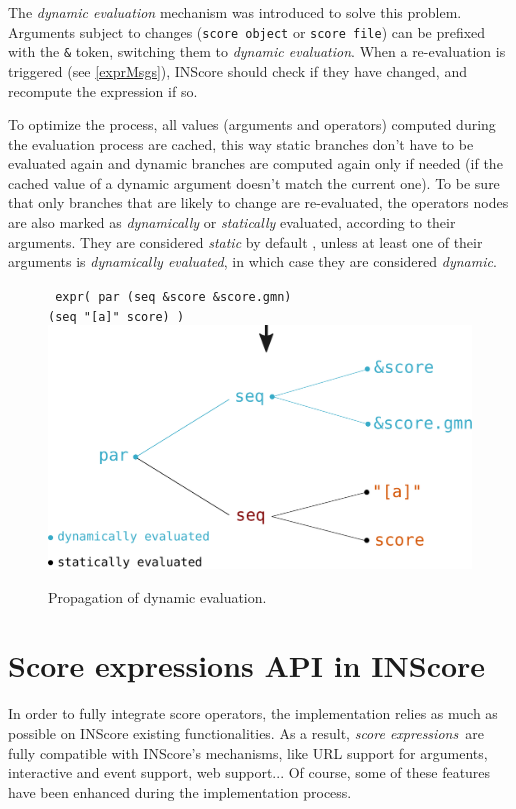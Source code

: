 \documentclass{article}
\newcommand{\OSC}[1]{\texttt{#1}}
\newcommand{\oper}[1]{\textcolor{figRed}{#1}}
\newcommand{\param}[1]{\textcolor{figOrange}{#1}}
\newcommand{\prefix}[1]{\textcolor{figBlue}{#1}}
\newcommand{\sExpr}{\emph{score expressions}}
\newcommand{\tab}{\hspace*{4mm}}
\begin{document}
The \emph{dynamic evaluation} mechanism was introduced to solve this problem. Arguments subject to changes (\OSC{score object} or \OSC{score file}) can be prefixed with the \OSC{\&} token, switching them to \emph{dynamic evaluation}. When a re-evaluation is triggered (see \ref{exprMsgs}), INScore should check if they have changed, and recompute the expression if so.

To optimize the process, all values (arguments and operators) computed during the evaluation process are cached, this way static branches don't have to be evaluated again and dynamic branches are computed again only if needed (if the cached value of a dynamic argument doesn't match the current one). To be sure that only branches that are likely to change are re-evaluated, the operators nodes are also marked as \emph{dynamically} or \emph{statically} evaluated, according to their arguments. They are considered \emph{static} by default 
, unless at least one of their arguments is \emph{dynamically evaluated}, in which case they are considered \emph{dynamic}.

\begin{figure}[th]
\centering
\OSC{ expr( \oper{par} (\oper{seq} \prefix{\&}\param{score} \prefix{\&}\param{score.gmn}) \\
 \tab\tab\tab\tab (\oper{seq} \param{"[a]" score}) )}
\includegraphics[width=0.9\columnwidth]{imgs/dynamicEval}
\caption{Propagation of dynamic evaluation.
\label{fig:dynamicEval}}
\end{figure}



\section{Score expressions API in INScore}
\label{exprAPI}
In order to fully integrate score operators, the implementation relies as much as possible on INScore existing functionalities. As a result, \sExpr\ are fully compatible with INScore's mechanisms, like URL support for arguments, interactive and event support,  web support... Of course, some of these features have been enhanced during the implementation process.
\end{document}
